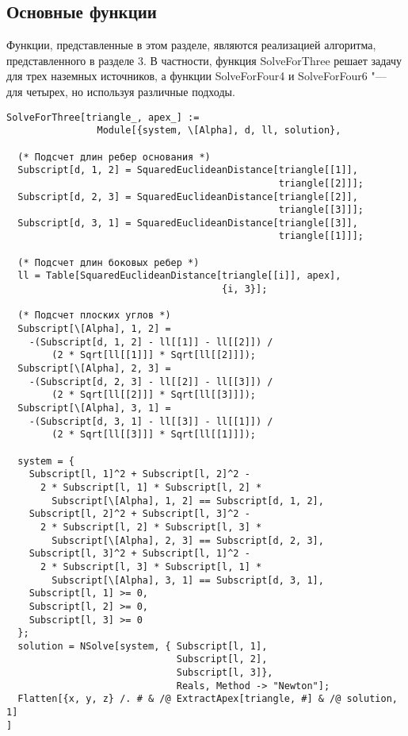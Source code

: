 \documentclass[../main.tex]{subfiles}
\begin{document}
\subsection{Основные функции}
Функции, представленные в этом разделе, являются реализацией алгоритма, представленного в разделе 3. В частности, функция {\ttfamily SolveForThree} решает задачу для трех наземных источников, а функции {\ttfamily SolveForFour4} и {\ttfamily SolveForFour6} "--- для четырех, но используя различные подходы.

\begin{lstlisting}
SolveForThree[triangle_, apex_] :=
                Module[{system, \[Alpha], d, ll, solution},

  (* Подсчет длин ребер основания *)
  Subscript[d, 1, 2] = SquaredEuclideanDistance[triangle[[1]],
                                                triangle[[2]]];
  Subscript[d, 2, 3] = SquaredEuclideanDistance[triangle[[2]],
                                                triangle[[3]]];
  Subscript[d, 3, 1] = SquaredEuclideanDistance[triangle[[3]],
                                                triangle[[1]]];

  (* Подсчет длин боковых ребер *)
  ll = Table[SquaredEuclideanDistance[triangle[[i]], apex],
                                      {i, 3}];

  (* Подсчет плоских углов *)
  Subscript[\[Alpha], 1, 2] =
    -(Subscript[d, 1, 2] - ll[[1]] - ll[[2]]) /
        (2 * Sqrt[ll[[1]]] * Sqrt[ll[[2]]]);
  Subscript[\[Alpha], 2, 3] =
    -(Subscript[d, 2, 3] - ll[[2]] - ll[[3]]) /
        (2 * Sqrt[ll[[2]]] * Sqrt[ll[[3]]]);
  Subscript[\[Alpha], 3, 1] =
    -(Subscript[d, 3, 1] - ll[[3]] - ll[[1]]) /
        (2 * Sqrt[ll[[3]]] * Sqrt[ll[[1]]]);

  system = {
    Subscript[l, 1]^2 + Subscript[l, 2]^2 -
      2 * Subscript[l, 1] * Subscript[l, 2] *
        Subscript[\[Alpha], 1, 2] == Subscript[d, 1, 2],
    Subscript[l, 2]^2 + Subscript[l, 3]^2 -
      2 * Subscript[l, 2] * Subscript[l, 3] *
        Subscript[\[Alpha], 2, 3] == Subscript[d, 2, 3],
    Subscript[l, 3]^2 + Subscript[l, 1]^2 -
      2 * Subscript[l, 3] * Subscript[l, 1] *
        Subscript[\[Alpha], 3, 1] == Subscript[d, 3, 1],
    Subscript[l, 1] >= 0,
    Subscript[l, 2] >= 0,
    Subscript[l, 3] >= 0
  };
  solution = NSolve[system, { Subscript[l, 1],
                              Subscript[l, 2],
                              Subscript[l, 3]},
                              Reals, Method -> "Newton"];
  Flatten[{x, y, z} /. # & /@ ExtractApex[triangle, #] & /@ solution, 1]
]


\end{lstlisting}
\end{document}
